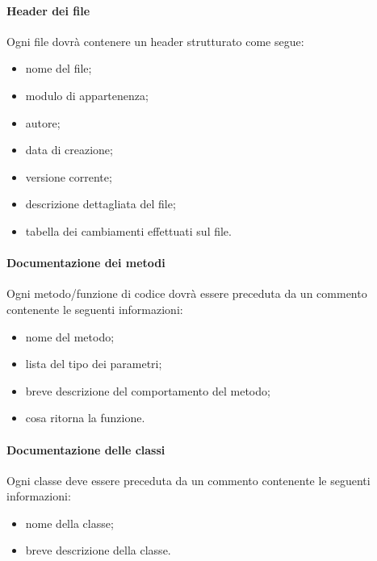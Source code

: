 \paragraph{Header dei file}

Ogni file dovrà contenere un header strutturato come segue:
\begin{itemize}
\item {} nome del file;
\item {} modulo di appartenenza;
\item {} autore;
\item {} data di creazione;
\item {} versione corrente;
\item {} descrizione dettagliata del file;
\item {} tabella dei cambiamenti effettuati sul file.
\end{itemize}

\paragraph{Documentazione dei metodi}

Ogni metodo/funzione di codice dovrà essere preceduta da un commento contenente le seguenti informazioni:
\begin{itemize}
\item {} nome del metodo;
\item {} lista del tipo dei parametri;
\item {} breve descrizione del comportamento del metodo;
\item {} cosa ritorna la funzione.
\end{itemize}

\paragraph{Documentazione delle classi}

Ogni classe deve essere preceduta da un commento contenente le seguenti informazioni:
\begin{itemize}
\item {} nome della classe;
\item {} breve descrizione della classe.
\end{itemize}

